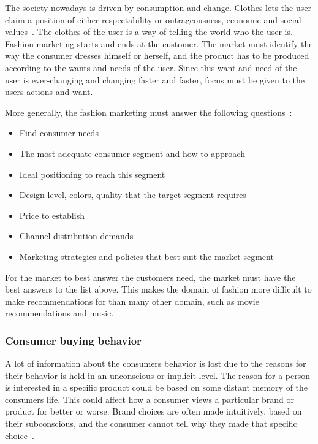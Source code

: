   The society nowadays is driven by consumption and change.
  Clothes lets the user claim a position of either respectability or outrageousness, economic and social values~\cite{barnard2002fashion}.
  The clothes of the user is a way of telling the world who the user is.
  Fashion marketing starts and ends at the customer.
  The market must identify the way the consumer dresses himself or herself, and the product has to be produced according to the wants and needs of the user.
  Since this want and need of the user is ever-changing and changing faster and faster, focus must be given to the users actions and want.

  More generally, the fashion marketing must answer the following questions~\cite{vignali2009fashion}:
  
  \begin{itemize}
    \item Find consumer needs
    \item The most adequate consumer segment and how to approach
    \item Ideal positioning to reach this segment
    \item Design level, colors, quality that the target segment requires
    \item Price to establish
    \item Channel distribution demands
    \item Marketing strategies and policies that best suit the market segment
  \end{itemize}

  For the market to best answer the customers need, the market must have the best answers to the list above.
  This makes the domain of fashion more difficult to make recommendations for than many other domain, such as movie recommendations and music.

\subsubsection{Consumer buying behavior}
  A lot of information about the consumers behavior is lost due to the reasons
  for their behavior is held in an unconscious or implicit level.  The reason for
  a person is interested in a specific product could be based on some distant
  memory of the consumers life.  This could affect how a consumer views a
  particular brand or product for better or worse.  Brand choices are often made
  intuitively, based on their subconscious, and the consumer cannot tell why
  they made that specific choice~\cite{vignali2009fashion}.

